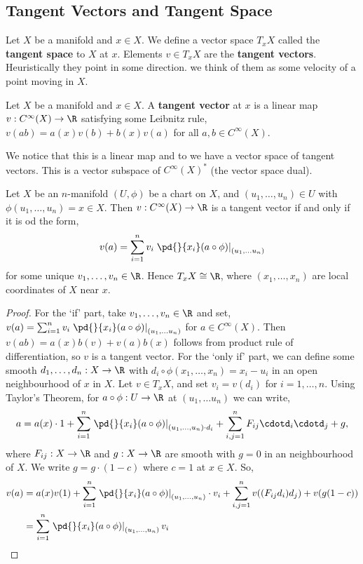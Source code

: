 
\subsection{Tangent Vectors and Tangent Space}
Let $X$ be a manifold and $x \in X$. We define a vector space $T_xX$ called the \textbf{tangent space} to $X$ at $x$. Elements $v \in T_xX$ are the \textbf{tangent vectors}. Heuristically they point in some direction. we think of them as some velocity of a point moving in $X$.
\begin{ndefi}
  Let $X$ be a manifold and $x \in X$. A \textbf{tangent vector} at $x$ is a linear map $v : C^\infty(X) \to \R$ satisfying some Leibnitz rule, $v(ab) = a(x)v(b) + b(x)v(a)$ for all $a, b \in C^\infty(X)$.
\end{ndefi}
\noindent
We notice that this is a linear map and to we have a vector space of tangent vectors. This is a vector subspace of $C^\infty(X)^*$ (the vector space dual).

\begin{nprop}
   Let $X$ be an $n$-manifold $(U, \phi)$ be a chart on $X$, and $(u_1,\dots, u_n) \in U$ with $\phi(u_1,\dots, u_n) = x \in X$. Then $v : C^\infty(X) \to \R$ is a tangent vector if and only if it is od the form,
   $$ v(a) = \sum_{i=1}^n v_i \left.\pd{}{x_i} (a \circ \phi)\right|_{(u_1, \dots u_n)} $$
   for some unique $v_1, \dots, v_n \in \R$. Hence $T_xX \cong \R$, where $(x_1, \dots, x_n)$ are local coordinates of $X$ near $x$.
\end{nprop}
\begin{proof}
  For the `if' part, take $v_1, \dots, v_n \in \R$ and set, $v(a) = \sum_{i=1}^n v_i \left.\pd{}{x_i} (a \circ \phi)\right|_{(u_1, \dots u_n)}$ for $a \in C^\infty(X)$. Then $v(ab) = a(x)b(v) + v(a)b(x)$ follows from product rule of differentiation, so $v$ is a tangent vector. For the `only if' part, we can define some smooth $d_1, \dots, d_n : X \to \R$ with $d_i \circ \phi (x_1, \dots, x_n) = x_i - u_i$ in an open neighbourhood of $x$ in $X$. Let $v \in T_xX$, and set $v_i = v(d_i)$ for $i = 1, \dots, n$.
  Using Taylor's Theorem, for $a \circ \phi : U \to \R$ at $(u_1, \dots u_n)$ we can write,
  $$ a = a(x) \cdot 1 + \sum_{i=1}^n \left.\pd{}{x_i} (a \circ \phi)\right|_{(u_1, \dots, u_n) \cdot d_i} + \sum_{i,j = 1}^n F_{ij} \cdotd_i \cdotd_j + g, $$
  where $F_{ij} : X\to \R$ and $g : X \to \R$ are smooth with $g = 0$ in an neighbourhood of $X$. We write $g = g \cdot (1 - c)$ where $c = 1$ at $x \in X$. So,
  \begin{align*}
    v(a) &= a(x)v(1) + \sum_{i=1}^n \left.\pd{}{x_i}(a \circ \phi) \right|_{(u_1, \dots, u_n)} \cdot v_i + \sum_{i,j = 1}^n v((F_{ij}d_i)d_j) + v(g(1 - c)) \\
    &= \sum_{i=1}^n \left.\pd{}{x_i} (a \circ \phi) \right|_{(u_1, \dots, u_n)}v_i
  \end{align*}
\end{proof}

